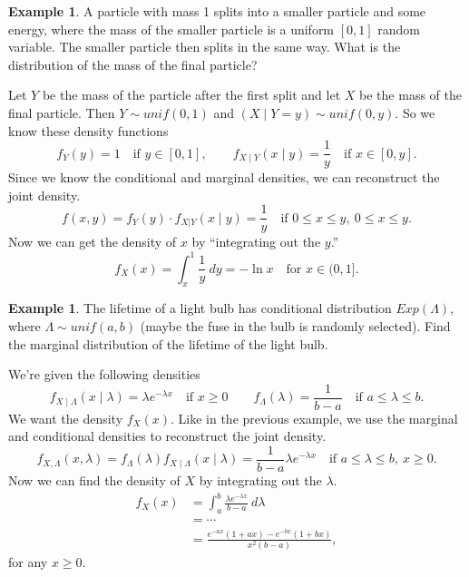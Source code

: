 \documentclass[12pt]{article}
\theoremstyle{plain}
\theoremstyle{definition}
\newtheorem{example}[theorem]{Example}
\theoremstyle{remark}
\begin{document}
\begin{example}
    A particle with mass 1 splits into a smaller particle and some energy, where the mass of the smaller particle is a uniform $[0,1]$ random variable.
    The smaller particle then splits in the same way.
    What is the distribution of the mass of the final particle?

    Let $Y$ be the mass of the particle after the first split and let $X$ be the mass of the final particle.
    Then $Y\sim unif(0,1)$ and $(X\mid Y = y) \sim unif(0, y)$.
    So we know these density functions
    \[
        f_Y(y) = 1\quad\text{if }y\in [0,1],\qquad f_{X\mid Y}(x\mid y) = \frac{1}{y}\quad\text{if }x\in [0,y].
    \]
    Since we know the conditional and marginal densities, we can reconstruct the joint density.
    \[
        f(x,y) = f_Y(y)\cdot f_{X|Y}(x\mid y) = \frac{1}{y}\quad\text{if }0\leq x \leq y,\ 0\leq x\leq y.
    \]
    Now we can get the density of $x$ by ``integrating out the $y$.''
    \[
        f_X(x) = \int_x^1\frac{1}{y}\ dy = -\ln x\quad \text{for }x\in (0,1].
    \]
\end{example}


\begin{example}
    The lifetime of a light bulb has conditional distribution $Exp(\Lambda)$, where $\Lambda \sim unif(a,b)$ (maybe the fuse in the bulb is randomly selected).
    Find the marginal distribution of the lifetime of the light bulb.

    We're given the following densities
    \[
        f_{X\mid \Lambda}(x\mid \lambda) = \lambda e^{-\lambda x}\quad\text{if } x\geq 0\qquad f_\Lambda(\lambda) = \frac{1}{b-a}\quad\text{if } a\leq \lambda \leq b.
    \]
    We want the density $f_X(x)$.
    Like in the previous example, we use the marginal and conditional densities to reconstruct the joint density.
    \[
        f_{X, \Lambda}(x, \lambda) = f_\Lambda(\lambda)f_{X\mid \Lambda}(x\mid \lambda) = \frac{1}{b-a}\lambda e^{-\lambda x}\quad\text{if }a\leq \lambda \leq b,\ x\geq 0.
    \]
    Now we can find the density of $X$ by integrating out the $\lambda$.
    \begin{align*}
        f_X(x) &= \int_a^b \frac{\lambda e^{-\lambda x}}{b-a}\ d\lambda\\
        &= \cdots\\
        &= \frac{e^{-ax}(1+ax) - e^{-bx}(1+bx)}{x^2(b-a)},
    \end{align*}
    for any $x\geq 0$.
\end{example}
\end{document}
